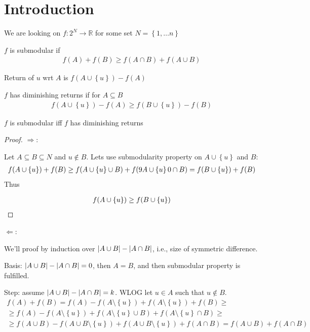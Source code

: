 \section{Introduction}
We are looking on $f: 2^N \to \mathbb{R}$ for some set $N = \left\{1, \dots n \right\}$
\begin{definition}
	$f$ is submodular if 
	\begin{align}
	f(A)+f(B) \geq f(A\cap B) + f(A\cup B)
	\end{align}
\end{definition}

\begin{definition}
	Return of $u$ wrt $A$ is $f(A \cup \left\{u \right\}) - f(A)$
	
\end{definition}
\begin{definition}
$f$ has diminishing returns if for $A\subseteq B$
\begin{align}
f(A \cup \left\{u \right\}) - f(A) \geq f(B \cup \left\{u \right\}) - f(B)
\end{align}
\end{definition}

\begin{prop}
	$f$ is submodular iff $f$ has diminishing returns
	\begin{proof}
		$\Rightarrow$:
		
		Let $A\subseteq B \subseteq N$ and $u\notin B$. Lets use submodularity property on $A\cup \left\{ u \right\}$ and $B$:
		\begin{align}
		f(A\cup \left\{ u \right\}) + f(B) \geq f\qty(A\cup \left\{ u \right\} \cup B) + f\qty(9A\cup \left\{ u \right\}0 \cap B)  = f\qty(B\cup \left\{ u \right\}) + f(B)  
		\end{align}
		Thus
		
		\begin{align}
		f(A\cup \left\{ u \right\}) \geq f\qty(B\cup \left\{ u \right\})  
		\end{align}
	\end{proof}


$\Leftarrow$:

We'll proof by induction over $\abs{A\cup B} - \abs{A\cap B}$, i.e., size of symmetric difference.

Basis: $\abs{A\cup B} - \abs{A\cap B} = 0$, then $A=B$, and then submodular property is fulfilled.

Step: assume $\abs{A\cup B} - \abs{A\cap B} = k$. WLOG let $u\in A$ such that $u\notin B$.
\begin{align}
f(A) + f(B) = f(A) - f(A \setminus \left\{u\right\}) + f(A \setminus  \left\{u\right\}) + f(B) \geq\\\geq  f(A) - f(A \setminus \left\{u\right\}) + f(A \setminus  \left\{u\right\} \cup B) + f(A \setminus  \left\{u\right\}  \cap B) \geq\\\geq f(A\cup B) -  f(A\cup B \setminus \left\{ u \right\}) + f(A  \cup B \setminus  \left\{u\right\} ) + f(A  \cap B) = f(A\cup B) + f(A\cap B)
\end{align}
\end{prop}

